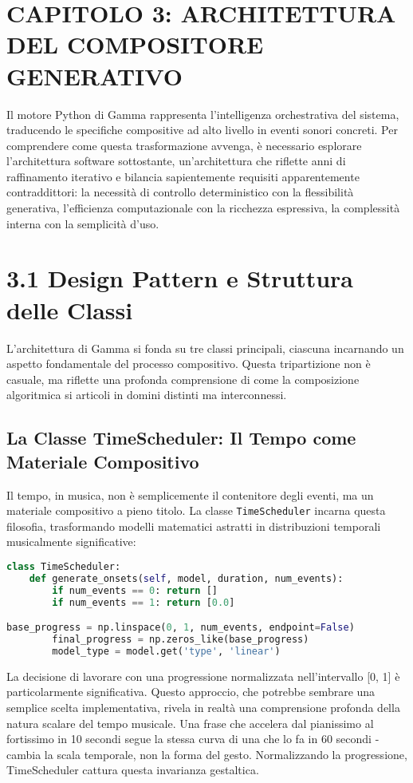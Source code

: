 
\section{CAPITOLO 3: ARCHITETTURA DEL COMPOSITORE GENERATIVO}
Il motore Python di Gamma rappresenta l'intelligenza orchestrativa del sistema, traducendo le specifiche compositive ad alto livello in eventi sonori concreti. Per comprendere come questa trasformazione avvenga, è necessario esplorare l'architettura software sottostante, un'architettura che riflette anni di raffinamento iterativo e bilancia sapientemente requisiti apparentemente contraddittori: la necessità di controllo deterministico con la flessibilità generativa, l'efficienza computazionale con la ricchezza espressiva, la complessità interna con la semplicità d'uso.
\section{3.1 Design Pattern e Struttura delle Classi}
L'architettura di Gamma si fonda su tre classi principali, ciascuna incarnando un aspetto fondamentale del processo compositivo. Questa tripartizione non è casuale, ma riflette una profonda comprensione di come la composizione algoritmica si articoli in domini distinti ma interconnessi.
\subsection{La Classe TimeScheduler: Il Tempo come Materiale Compositivo}
Il tempo, in musica, non è semplicemente il contenitore degli eventi, ma un materiale compositivo a pieno titolo. La classe \texttt{TimeScheduler} incarna questa filosofia, trasformando modelli matematici astratti in distribuzioni temporali musicalmente significative:

\begin{lstlisting}[language=Python]
class TimeScheduler:
    def generate_onsets(self, model, duration, num_events):
        if num_events == 0: return []
        if num_events == 1: return [0.0]

base_progress = np.linspace(0, 1, num_events, endpoint=False)
        final_progress = np.zeros_like(base_progress)
        model_type = model.get('type', 'linear')
\end{lstlisting}

La decisione di lavorare con una progressione normalizzata nell'intervallo [0, 1] è particolarmente significativa. Questo approccio, che potrebbe sembrare una semplice scelta implementativa, rivela in realtà una comprensione profonda della natura scalare del tempo musicale. Una frase che accelera dal pianissimo al fortissimo in 10 secondi segue la stessa curva di una che lo fa in 60 secondi - cambia la scala temporale, non la forma del gesto. Normalizzando la progressione, TimeScheduler cattura questa invarianza gestaltica.

